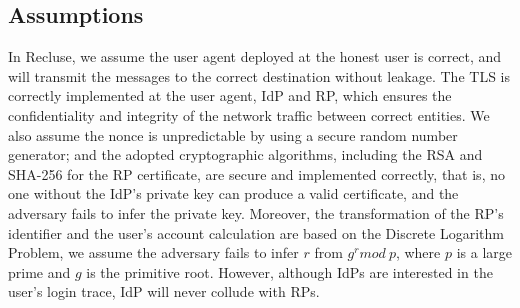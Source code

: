 \subsection{Assumptions}
In Recluse, we assume the user agent deployed at the honest user is correct,
and will transmit the messages to the correct destination without leakage.
The TLS is correctly implemented at the user agent, IdP and RP, which ensures the confidentiality and integrity of the network traffic between correct entities.
We also assume the nonce is unpredictable by using  a secure random number generator;
and the adopted cryptographic algorithms, including the RSA and SHA-256 for the RP certificate, are secure and implemented correctly, that is, no one without the IdP's private key can produce a valid certificate,
and the adversary fails to infer the private key.
Moreover, the transformation of the RP's identifier and the user's account calculation are based on the Discrete Logarithm Problem,
we assume the adversary fails to infer $r$ from $g^r mod\ p$, where $p$ is a large prime and $g$ is the primitive root.
However, although IdPs are interested in the user's login trace, IdP will never collude with RPs.







